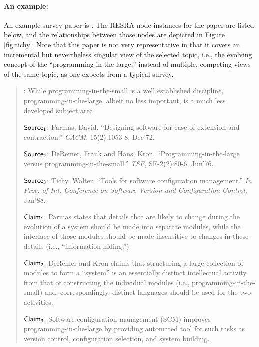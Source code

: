 \begin{itemize}
{\paragraph{An example:}

An example survey paper is \cite{Tichy92}. The RESRA node
instances for the paper are listed below, and the relationships between
those nodes are depicted in Figure \ref{fig:tichy}. Note that this paper is
not very representative in that it covers an incremental but nevertheless
singular view of the selected topic, i.e., the evolving concept of
the ``programming-in-the-large,'' instead of multiple, competing views of
the same topic, as one expects from a typical survey.

\small
\begin{quotation}
  : While programming-in-the-small is a well
  established discipline, programming-in-the-large, albeit no less
  important, is a much less developed subject area.
  
  \noindent \( {\sf Source_{1}} \): Parmas, David. ``Designing software for
  ease of extension and contraction.'' {\it CACM\/}, 15(2):1053-8, Dec'72.

  \noindent \( {\sf Source_{2}} \): DeRemer, Frank and Hans, Kron.
  ``Programming-in-the-large versus programming-in-the-small.'' {\it
  TSE\/}, SE-2(2):80-6, Jun'76.
  
  \noindent \( {\sf Source_{3}} \): Tichy, Walter. ``Tools for software
  configuration management.'' {\it In Proc. of Int. Conference on Software
  Version and Configuration Control\/}, Jan'88.
  
  \noindent\( {\sf Claim_{1}\/} \): Parmas states that details that are
  likely to change during the evolution of a system should be made into
  separate modules, while the interface of those modules should be made
  insensitive to changes in these details (i.e., ``information hiding.'')
  
  \noindent\( {\sf Claim_{2}} \): DeRemer and Kron claims that
  structuring a large collection of modules to form a ``system'' is an
  essentially distinct intellectual activity from that of constructing
  the individual modules (i.e., programming-in-the-small) and,
  correspondingly, distinct languages should be used for the two
  activities.
  
  \noindent\( {\sf Claim_{3}} \): Software configuration management (SCM)
  improves programming-in-the-large by providing automated tool for such
  tasks as version control, configuration selection, and system building.
  

\end{quotation}}
\end{itemize}
